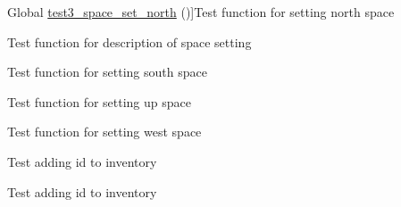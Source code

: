 \begin{DoxyRefList}
\hypertarget{test__test000150}{}%
Global \hyperlink{space__test_8c_ac2961dcc4d7645660ca6953a70315b0a}{test3\+\_\+space\+\_\+set\+\_\+north} ()]Test function for setting north space  
\item[\label{test__test000137}%
\hypertarget{test__test000137}{}%
Global \hyperlink{space__test_8c_afe042540e90d5901e352bbd4a45ec4ac}{test3\+\_\+space\+\_\+set\+\_\+short\+\_\+description} ()]Test function for description of space setting  
\item[\label{test__test000155}%
\hypertarget{test__test000155}{}%
Global \hyperlink{space__test_8c_ab2626f0045b225c79a8c5d56298e2065}{test3\+\_\+space\+\_\+set\+\_\+south} ()]Test function for setting south space  
\item[\label{test__test000174}%
\hypertarget{test__test000174}{}%
Global \hyperlink{space__test_8c_a4b9cd940aa6ec095996f2051ee938070}{test3\+\_\+space\+\_\+set\+\_\+up} ()]Test function for setting up space  
\item[\label{test__test000165}%
\hypertarget{test__test000165}{}%
Global \hyperlink{space__test_8c_a8150758940559ef958649a2fab36bee0}{test3\+\_\+space\+\_\+set\+\_\+west} ()]Test function for setting west space  
\item[\label{test__test000005}%
\hypertarget{test__test000005}{}%
Global \hyperlink{inventory__test_8c_a967d37c163cbf8ea9335b506c1713f4a}{test4\+\_\+inventory\+\_\+add\+\_\+id} ()]Test adding id to inventory  
\item[\label{test__test000006}%
\hypertarget{test__test000006}{}%
Global \hyperlink{inventory__test_8c_a8e69ae5a26b0115971e51ab94616fb85}{test5\+\_\+inventory\+\_\+add\+\_\+id} ()]Test adding id to inventory 
\end{DoxyRefList}